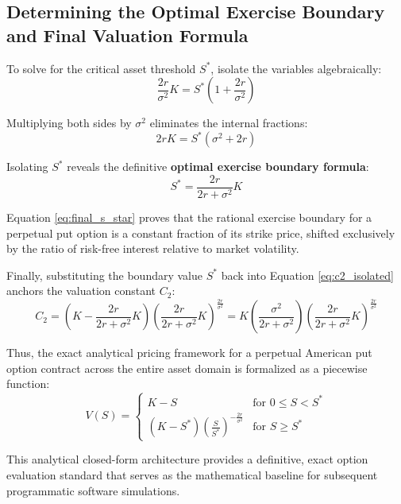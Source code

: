 \documentclass[12pt]{article}
\theoremstyle{definition}
\numberwithin{equation}{section}
\begin{document}
\subsection{Determining the Optimal Exercise Boundary and Final Valuation Formula}
To solve for the critical asset threshold $S^*$, isolate the variables algebraically:
\begin{equation}
\frac{2r}{\sigma^2}K = S^*\left(1 + \frac{2r}{\sigma^2}\right)
\end{equation}

Multiplying both sides by $\sigma^2$ eliminates the internal fractions:
\begin{equation}
2rK = S^*( \sigma^2 + 2r )
\end{equation}

Isolating $S^*$ reveals the definitive \textbf{optimal exercise boundary formula}:
\begin{equation}\label{eq:final_s_star}
S^* = \frac{2r}{2r + \sigma^2}K
\end{equation}

Equation \eqref{eq:final_s_star} proves that the rational exercise boundary for a perpetual put option is a constant fraction of its strike price, shifted exclusively by the ratio of risk-free interest relative to market volatility. 

Finally, substituting the boundary value $S^*$ back into Equation \eqref{eq:c2_isolated} anchors the valuation constant $C_2$:
\begin{equation}
C_2 = \left(K - \frac{2r}{2r + \sigma^2}K\right)\left(\frac{2r}{2r + \sigma^2}K\right)^{\frac{2r}{\sigma^2}} = K\left(\frac{\sigma^2}{2r + \sigma^2}\right)\left(\frac{2r}{2r + \sigma^2}K\right)^{\frac{2r}{\sigma^2}}
\end{equation}

Thus, the exact analytical pricing framework for a perpetual American put option contract across the entire asset domain is formalized as a piecewise function:
\begin{equation}\label{eq:final_valuation_model}
V(S) = 
\begin{cases} 
K - S & \text{for } 0 \le S < S^* \\
\left(K - S^*\right)\left(\frac{S}{S^*}\right)^{-\frac{2r}{\sigma^2}} & \text{for } S \ge S^*
\end{cases}
\end{equation}

This analytical closed-form architecture provides a definitive, exact option evaluation standard that serves as the mathematical baseline for subsequent programmatic software simulations.
\end{document}

